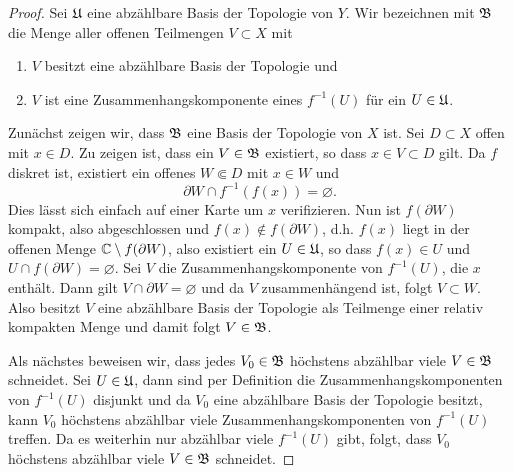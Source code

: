 \begin{proof}
  Sei $\mathfrak{U}$ eine abzählbare Basis der Topologie von $Y$. 
  Wir bezeichnen mit $\mathfrak{B}$ die Menge aller offenen Teilmengen $V \subset X$
  mit
  \begin{enumerate}
  \item $V$ besitzt eine abzählbare Basis der Topologie und 
  \item $V$ ist eine Zusammenhangskomponente eines $f^{-1}(U)$ für ein
    $U \in \mathfrak{U}$.
  \end{enumerate}
  Zunächst zeigen wir, dass $\mathfrak{B}$ eine Basis der Topologie von $X$ ist.
  Sei $D \subset X$ offen mit $x \in D$. Zu zeigen ist, dass ein $V
  \in \mathfrak{B}$ existiert, so dass $x \in V \subset D$ gilt.
  Da $f$ diskret ist, existiert ein offenes $W \Subset D$  mit $x \in W$ und
  \[
  \partial W \cap f^{-1}(f(x)) = \varnothing.
  \]
  Dies lässt sich einfach auf einer Karte um $x$
  verifizieren. 
  Nun ist $f(\partial W)$ kompakt, also abgeschlossen und $f(x)
  \notin f(\partial W)$, d.h. $f(x)$ liegt in der offenen Menge $\mathbb{C}
  \setminus f(\partial W)$, also existiert ein $U \in \mathfrak{U}$, so dass
  $f(x) \in U$ und $U \cap f(\partial W) = \varnothing$. Sei  $V$
  die Zusammenhangskomponente von $f^{-1}(U)$, die $x$ enthält. Dann
  gilt $V \cap \partial W = \varnothing$ und da $V$ zusammenhängend
  ist, folgt $V \subset W$. Also besitzt $V$ eine abzählbare Basis
  der Topologie als Teilmenge einer relativ kompakten Menge und
  damit folgt $V \in \mathfrak{B}$.
  
  Als nächstes beweisen wir, dass jedes $V_0 \in \mathfrak{B}$ höchstens abzählbar
  viele $V \in \mathfrak{B}$ schneidet.
  Sei $U \in \mathfrak{U}$, dann sind per Definition die
  Zusammenhangskomponenten von $f^{-1}(U)$ disjunkt und da $V_0$
  eine abzählbare Basis der Topologie besitzt, kann $V_0$ höchstens
  abzählbar viele Zusammenhangskomponenten von $f^{-1}(U)$
  treffen. Da es weiterhin nur abzählbar viele $f^{-1}(U)$ gibt, folgt, dass
  $V_0$ höchstens abzählbar viele $V \in \mathfrak{B}$ schneidet.
  

\end{proof}
